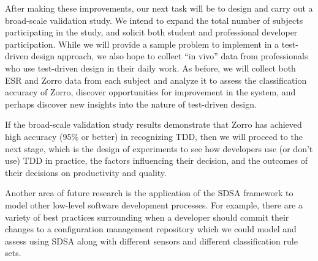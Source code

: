 \documentclass[runningheads]{llncs}
\begin{document}
After making these improvements, our next task will be to design and carry
out a broad-scale validation study.  We intend to  expand the total
number of subjects participating in the study, and solicit both student and
professional developer participation. While we will provide a sample
problem to implement in a test-driven design approach, we also hope to
collect ``in vivo'' data from professionals who use test-driven design in
their daily work.  As before, we will collect both ESR and Zorro data from
each subject and analyze it to assess the classification accuracy of Zorro,
discover opportunities for improvement in the system, and perhaps discover
new insights into the nature of test-driven design.

If the broad-scale validation study results demonstrate that Zorro has
achieved high accuracy (95\% or better) in recognizing TDD, then we will
proceed to the next stage, which is the design of experiments to see how
developers use (or don't use) TDD in practice, the factors influencing
their decision, and the outcomes of their decisions on productivity and
quality.

Another area of future research is the application of the SDSA framework to
model other low-level software development processes.  For example, there
are a variety of best practices surrounding when a developer should commit
their changes to a configuration management repository which we could model
and assess using SDSA along with different sensors and different
classification rule sets.



\end{document}
